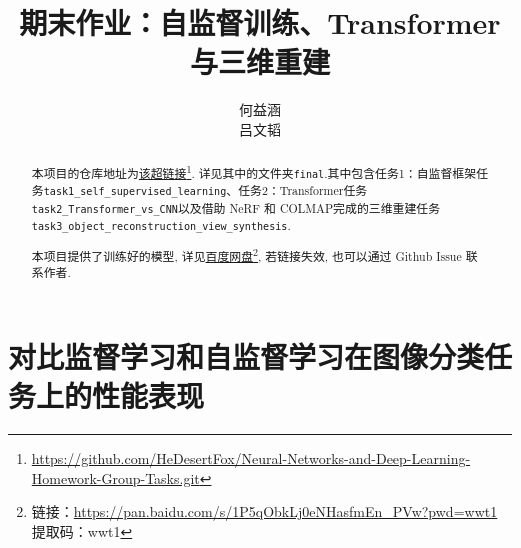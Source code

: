 \documentclass[notitlepage,cs4size,punct,oneside]{ctexrep}
\title{{\zihao{1}\bfseries 期末作业：自监督训练、Transformer与三维重建}}
\author{何益涵 \quad 20307110032\\吕文韬 \quad 23210180109}
\date{}
\numberwithin{equation}{chapter}
\theoremstyle{mystyle}
\begin{document}
\CTEXoptions[abstractname={摘要: }]
\CTEXoptions[bibname={\bfseries 参考文献}]

\renewcommand{\thepage}{\roman{page}}
\setcounter{page}{1}

\maketitle\renewcommand{\thepage}{\arabic{page}}
\thispagestyle{empty}\setcounter{page}{0}
\renewcommand{\abstractname}{摘要: }
\begin{abstract}
     本项目的仓库地址为\href{https://github.com/HeDesertFox/Neural-Networks-and-Deep-Learning-Homework-Group-Tasks.git}{该超链接}\footnote{\href{https://github.com/HeDesertFox/Neural-Networks-and-Deep-Learning-Homework-Group-Tasks.git}{https://github.com/HeDesertFox/Neural-Networks-and-Deep-Learning-Homework-Group-Tasks.git}}. 详见其中的文件夹\texttt{final}.其中包含任务1：自监督框架任务\texttt{task1\_self\_supervised\_learning}、任务2：Transformer任务\texttt{task2\_Transformer\_vs\_CNN}以及借助 NeRF 和 COLMAP完成的三维重建任务\texttt{task3\_object\_reconstruction\_view\_synthesis}.

     本项目提供了训练好的模型, 详见\href{https://pan.baidu.com/s/1P5qObkLj0eNHasfmEn_PVw?pwd=wwt1}{百度网盘}\footnote{链接：\url{https://pan.baidu.com/s/1P5qObkLj0eNHasfmEn_PVw?pwd=wwt1} 提取码：wwt1}, 若链接失效, 也可以通过 Github Issue 联系作者.

\end{abstract}



\chapter{对比监督学习和自监督学习在图像分类任务上的性能表现}
\end{document}
